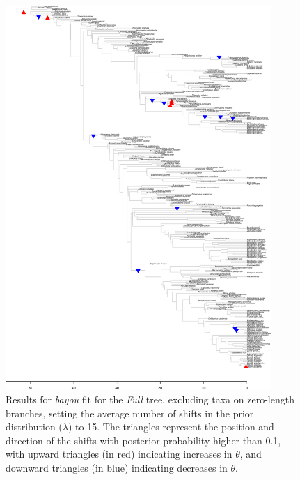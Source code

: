 \begin{figure}[H]
\includegraphics[width=0.9\textwidth]{img/plots-full-k15-1.pdf}
\caption{Results for \textit{bayou} fit for the \textit{Full} tree, excluding taxa on zero-length branches, setting the average number of shifts in the prior distribution ($\lambda$) to 15. The triangles represent the position and direction of the shifts with posterior probability higher than 0.1, with upward triangles (in red) indicating increases in $\theta$, and downward triangles (in blue) indicating decreases in $\theta$.}
\label{fig:full-k15-nzlb}
\end{figure}

\newpage

